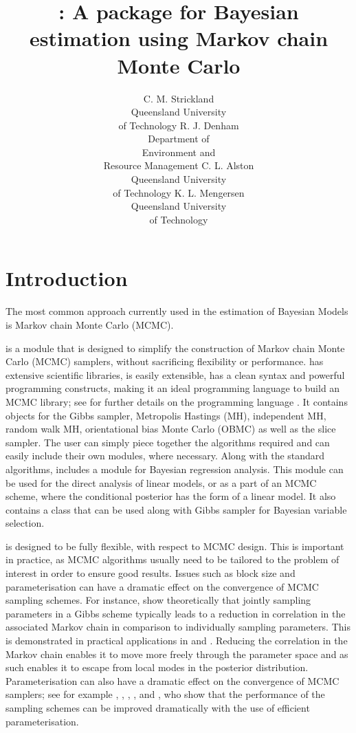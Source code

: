 \documentclass[article]{jss}
\author{C. M. Strickland\\Queensland University\\ of Technology \And 
        R. J. Denham\\Department of \\Environment and\\ Resource Management \And
        C. L. Alston\\Queensland University\\ of Technology \And 
        K. L. Mengersen\\Queensland University\\ of Technology}
\title{\pkg{PyMCMC}: A \proglang{Python} package for Bayesian estimation using Markov chain Monte Carlo}
\begin{document}
\section{Introduction}

The most common approach currently used in the estimation of Bayesian
Models is Markov chain Monte Carlo (MCMC). 

 is a  module that is designed to simplify the construction
of Markov chain Monte Carlo (MCMC) samplers, without sacrificing flexibility
or performance.  has extensive scientific libraries, is easily
extensible, has a clean syntax and powerful programming constructs,
making it an ideal programming language to build an MCMC library;
see \citet{Python} for further details on the programming language
. It contains objects for the Gibbs sampler, Metropolis Hastings
(MH), independent MH, random walk MH, orientational bias Monte Carlo
(OBMC) as well as the slice sampler. The user can simply piece together
the algorithms required and can easily include their own modules,
where necessary. Along with the standard algorithms,  includes
a module for Bayesian regression analysis. This module can be used
for the direct analysis of linear models, or as a part of an MCMC
scheme, where the conditional posterior has the form of a linear model.
It also contains a class that can be used along with Gibbs sampler
for Bayesian variable selection.

 is designed to be fully flexible, with respect to MCMC design.
This is important in practice, as MCMC algorithms usually need to
be tailored to the problem of interest in order to ensure good results.
Issues such as block size and parameterisation can have a dramatic
effect on the convergence of MCMC sampling schemes. For instance,
\citet{LuiKongWong1994} show theoretically that jointly sampling
parameters in a Gibbs scheme typically leads to a reduction in correlation
in the associated Markov chain in comparison to individually sampling
parameters. This is demonstrated in practical applications in \citet{CarterKohn1994}
and \citet{KimShephardChib1998}. Reducing the correlation in the
Markov chain enables it to move more freely through the parameter
space and as such enables it to escape from local modes in the posterior
distribution. Parameterisation can also have a dramatic effect on
the convergence of MCMC samplers; see for example \citet{GelfandSahuCarlin1995},
\citet{RobersSahu1997}, \citet{PittShepard1999}, \citet{RobertMengersen1999},
\citet{FruwirthSchnatter2004} and \citet{StricklandMartinForbes2008},
who show that the performance of the sampling schemes can be improved
dramatically with the use of efficient parameterisation.
\end{document}
